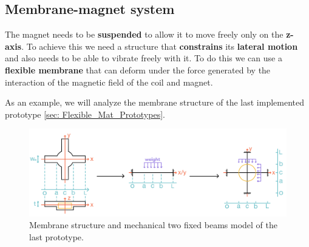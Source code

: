 \subsection{Membrane-magnet system}
\label{sec: Membrane-magnet_system}

The magnet needs to be \textbf{suspended} to allow it to move freely only on the \textbf{z-axis}.
To achieve this we need a structure that \textbf{constrains} its \textbf{lateral motion} and also needs to be able to vibrate freely with it.
To do this we can use a \textbf{flexible membrane} that can deform under the force generated by the interaction of the magnetic field of the coil and magnet. 

\begin{samepage}
    As an example, we will analyze the membrane structure of the last implemented prototype \ref{sec: Flexible_Mat_Prototypes}.
    \nopagebreak

    \begin{figure}[H]
        \centering
        \includegraphics[width=1\linewidth]{Chapters/Chapter2/Modelling_of_Entire_System/Figures/membr_mech_model.jpg} 
        \caption[Membrane structure]{Membrane structure and mechanical two fixed beams model of the last prototype.}
        \label{fig: Membrane_structure}
    \end{figure}
\end{samepage}

